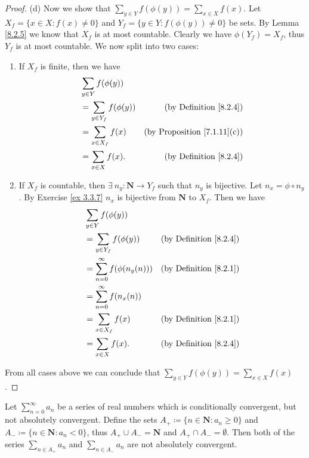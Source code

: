 \begin{proof}{(d)}
    Now we show that \(\sum_{y \in Y} f(\phi(y)) = \sum_{x \in X} f(x)\).
    Let \(X_f = \{x \in X : f(x) \neq 0\}\) and \(Y_f = \{y \in Y : f(\phi(y)) \neq 0\}\) be sets.
    By Lemma \ref{8.2.5} we know that \(X_f\) is at most countable.
    Clearly we have \(\phi(Y_f) = X_f\), thus \(Y_f\) is at most countable.
    We now split into two cases:
    \begin{enumerate}[label=(\Roman*)]
        \item If \(X_f\) is finite, then we have
        \begin{align*}
            & \sum_{y \in Y} f(\phi(y)) \\
            & = \sum_{y \in Y_f} f(\phi(y)) & \text{(by Definition \ref{8.2.4})} \\
            & = \sum_{x \in X_f} f(x) & \text{(by Proposition \ref{7.1.11}(c))} \\
            & = \sum_{x \in X} f(x). & \text{(by Definition \ref{8.2.4})}
        \end{align*}
        \item If \(X_f\) is countable, then \(\exists\ n_y : \mathbf{N} \to Y_f\) such that \(n_y\) is bijective.
        Let \(n_x = \phi \circ n_y\).
        By Exercise \ref{ex 3.3.7} \(n_x\) is bijective from \(\mathbf{N}\) to \(X_f\).
        Then we have
        \begin{align*}
            & \sum_{y \in Y} f(\phi(y)) \\
            & = \sum_{y \in Y_f} f(\phi(y)) & \text{(by Definition \ref{8.2.4})} \\
            & = \sum_{n = 0}^\infty f(\phi(n_y(n))) & \text{(by Definition \ref{8.2.1})} \\
            & = \sum_{n = 0}^\infty f(n_x(n)) \\
            & = \sum_{x \in X_f} f(x) & \text{(by Definition \ref{8.2.1})} \\
            & = \sum_{x \in X} f(x). & \text{(by Definition \ref{8.2.4})}
        \end{align*}
    \end{enumerate}
    From all cases above we can conclude that \(\sum_{y \in Y} f(\phi(y)) = \sum_{x \in X} f(x)\).
\end{proof}

\begin{lemma}\label{8.2.7}
    Let \(\sum_{n = 0}^\infty a_n\) be a series of real numbers which is conditionally convergent, but not absolutely convergent.
    Define the sets \(A_+ \coloneqq \{n \in \mathbf{N} : a_n \geq 0\}\) and \(A_- \coloneqq \{n \in \mathbf{N} : a_n < 0\}\), thus \(A_+ \cup A_- = \mathbf{N}\) and \(A_+ \cap A_- = \emptyset\).
    Then both of the series \(\sum_{n \in A_+} a_n\) and \(\sum_{n \in A_-} a_n\) are not absolutely convergent.
\end{lemma}

